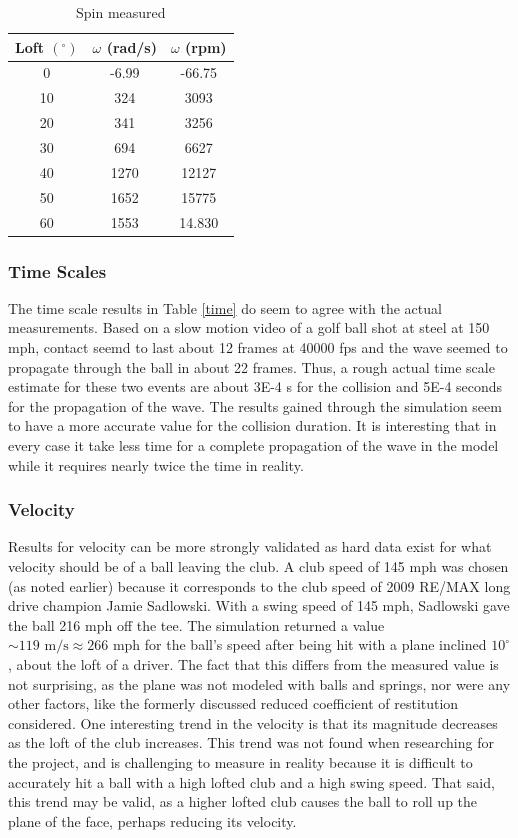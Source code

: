 \documentclass{article}
\begin{document}
\begin{table}
\begin{center}
\begin{tabular}{| c || c | c |} \hline
Loft $(^{\circ})$ & $\omega$ (rad/s) & $\omega$ (rpm) \\ \hline
0 & -6.99 & -66.75  \\
10 & 324 & 3093 \\
20 & 341 & 3256 \\
30 & 694 & 6627 \\
40 & 1270 & 12127 \\
50 & 1652 & 15775 \\
60 & 1553 & 14.830 \\ \hline
\end{tabular}
\label{spin}
\caption{Spin measured}
\end{center}
\end{table}

\subsubsection{Time Scales}
The time scale results in Table \ref{time} do seem to agree with the actual measurements. Based on a slow motion video of a golf ball shot at steel at 150 mph, contact seemd to last about 12 frames at 40000 fps and the wave seemed to propagate through the ball in about 22 frames. Thus, a rough actual time scale estimate for these two events are about 3E-4 s for the collision and 5E-4 seconds for the propagation of the wave. The results gained through the simulation seem to have a more accurate value for the collision duration. It is interesting that in every case it take less time for a complete propagation of the wave in the model while it requires nearly twice the time in reality.

\subsubsection{Velocity}
Results for velocity can be more strongly validated as hard data exist for what velocity should be of a ball leaving the club. A club speed of 145 mph was chosen (as noted earlier) because it corresponds to the club speed of 2009 RE/MAX long drive champion Jamie Sadlowski. With a swing speed of 145 mph, Sadlowski gave the ball 216 mph of\mbox{f} the tee. The simulation returned a value $\sim 119 \text{ m/s} \approx 266 \text{ mph}$ for the ball's speed after being hit with a plane inclined $10^{\circ}$, about the loft of a driver. The fact that this dif\mbox{f}ers from the measured value is not surprising, as the plane was not modeled with balls and springs, nor were any other factors, like the formerly discussed reduced coef\mbox{f}icient of restitution considered. One interesting trend in the velocity is that its magnitude decreases as the loft of the club increases. This trend was not found when researching for the project, and is challenging to measure in reality because it is dif\mbox{f}icult to accurately hit a ball with a high lofted club and a high swing speed. That said, this trend may be valid, as a higher lofted club causes the ball to roll up the plane of the face, perhaps reducing its velocity.
\end{document}
